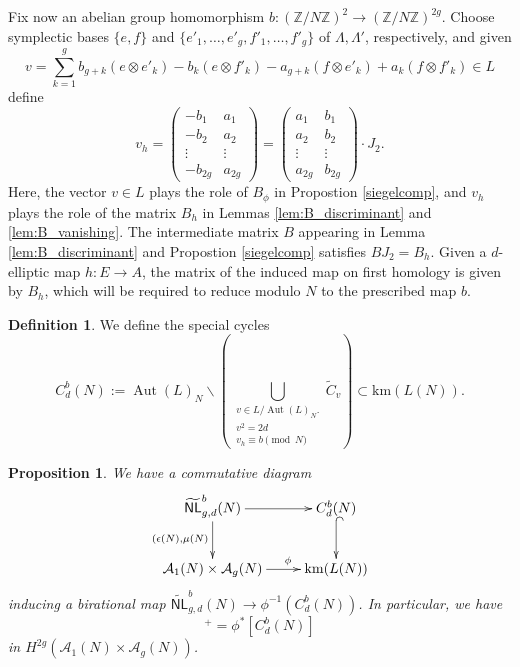 \documentclass[12pt]{amsart}
\def\cA{\mathcal{A}}
\def\bZ{\mathbb{Z}}
\def\wt{\widetilde}
\DeclareMathOperator{\Aut}{Aut}
\newcommand{\wNL}{{\widetilde{\mathsf{NL}}}}
\newcommand{\km}{\mathrm{km}}
\newtheorem{prop}[thm]{Proposition}
\theoremstyle{definition}
\newtheorem{defn}[thm]{Definition}
\begin{document}
Fix now an abelian group homomorphism $b:(\bZ/N\bZ)^2\to (\bZ/N\bZ)^{2g}$. Choose symplectic bases $\{e,f\}$ and $\{e'_1,\ldots,e'_g,f'_1,\ldots,f'_g\}$ of $\Lambda,\Lambda'$, respectively, and given
\begin{equation*}
    v=\sum_{k=1}^g b_{g+k}(e\otimes e'_k)-b_k(e\otimes f'_k)-a_{g+k}(f\otimes e'_k)+a_k(f\otimes f'_k)\in L
\end{equation*}
define
\begin{equation*}
    v_h=
    \begin{pmatrix}
        -b_1 & a_1\\
        -b_2 & a_2\\
        \vdots & \vdots\\
        -b_{2g} & a_{2g}
    \end{pmatrix}
    =\begin{pmatrix}
a_1 & b_1 \\
a_2 & b_2 \\
\vdots & \vdots\\
a_{2g} & b_{2g}
\end{pmatrix}
\cdot J_2.
\end{equation*}
Here, the vector $v\in L$ plays the role of $B_\phi$ in Propostion \ref{siegelcomp}, and $v_h$ plays the role of the matrix $B_h$ in Lemmas \ref{lem:B_discriminant} and \ref{lem:B_vanishing}. The intermediate matrix $B$ appearing in Lemma \ref{lem:B_discriminant} and Propostion \ref{siegelcomp} satisfies $BJ_2=B_h$. Given a $d$-elliptic map $h:E\to A$, the matrix of the induced map on first homology is given by $B_h$, which will be required to reduce modulo $N$ to the prescribed map $b$.

\begin{defn}
We define the special cycles
\begin{equation*}
C^b_{d}(N) := \Aut(L)_N \backslash\left(\bigcup_{\substack{v\in L /\Aut(L)_N. \\ v^2=2d \\ v_h\equiv b\pmod{N}}} \wt{C}_v \right) \subset \km(L(N)).
\end{equation*}
\end{defn}

\begin{prop}\label{special_cycle_pullback}
We have a commutative diagram
\begin{equation*}
\xymatrix{
    \wNL_{g,d}^b(N) \ar[r] \ar[d]_{(\epsilon(N),\mu(N)} & C^b_d(N) \ar@{^{(}->}[d] \\
    \cA_1(N) \times \cA_g(N) \ar[r]^(0.61){\phi} & \km(L(N))
}
\end{equation*}
inducing a birational map $\wNL_{g,d}^b(N) \to \phi^{-1}(C^b_d(N))$. In particular, we have 
\begin{equation*}
    [\wNL_{g,d}^{b}(N)]^+=\phi^{*}[ C^b_d(N)]
\end{equation*}
in $H^{2g}(\cA_1(N)\times\cA_g(N))$.
\end{prop}
\end{document}
